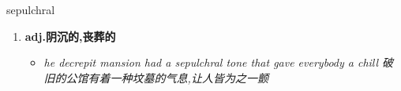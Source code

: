 
\begin{frame}
{\huge sepulchral}
\begin{center}
\begin{enumerate}\Large
  \item \textbf{adj.阴沉的,丧葬的}
  \begin{itemize}
    \item \em{\Large{he decrepit mansion had a sepulchral tone that gave everybody a chill 破旧的公馆有着一种坟墓的气息,让人皆为之一颤}}
  \end{itemize}
\end{enumerate}
\end{center}
\end{frame}
